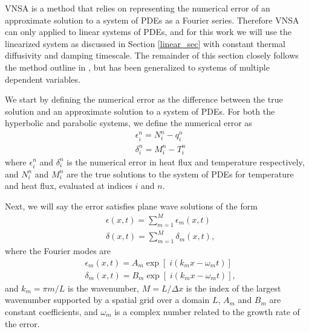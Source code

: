 \documentclass[iop]{emulateapj}
\begin{document}
			\ac{VNSA} is a method that relies on representing the numerical error of an approximate solution to a system of \acp{PDE} as a Fourier series.
				Therefore \ac{VNSA} can only applied to linear systems of \acp{PDE}, and for this work we will use the linearized system as discussed in Section \ref{linear_sec} with constant thermal diffusivity and damping timescale. The remainder of this section closely follows the method outline in \cite{cfd_book}, but has been generalized to systems of multiple dependent variables.
				
			We start by defining the numerical error as the difference between the true solution and an approximate solution to a system of \acp{PDE}.
				For both the hyperbolic and parabolic systems, we define the numerical error as
				\begin{align}
					& \epsilon_i^n = N_i^n - q_i^n \\
					& \delta_i^n = M_i^n - T_i^n
				\end{align}
				where $\epsilon_i^n$ and $\delta_i^n$ is the numerical error in heat flux and temperature respectively, and $N_i^n$ and $M_i^n$ are the true solutions to the system of \acp{PDE} for temperature and heat flux, evaluated at indices $i$ and $n$.
				
			Next, we will say the error satisfies plane wave solutions of the form
				\begin{align}
					& \epsilon(x,t) = \sum_{m=1}^{M} \epsilon_m(x,t) \\
					& \delta(x,t) = \sum_{m=1}^{M} \delta_m(x,t),
				\end{align}
				where the Fourier modes are
				\begin{align}
				& \epsilon_m(x,t) = A_m \exp \left[ \; i (k_m x - \omega_m t) \right] \\
				& \delta_m(x,t) = B_m \exp \left[ \; i (k_m x - \omega_m t) \right],
				\end{align}
				and  $k_m = \pi m /L$ is the wavenumber, $M = L / \Delta x$ is the index of the largest wavenumber supported by a spatial grid over a domain $L$, $A_m$ and $B_m$ are constant coefficients, and $\omega_m$ is a complex number related to the growth rate of the error.
				
\end{document}
